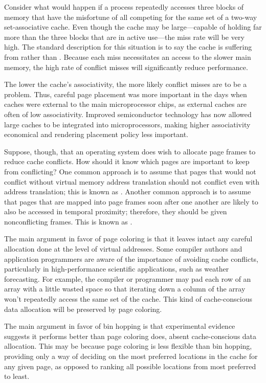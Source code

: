 Consider what would happen if a process repeatedly accesses three
blocks of memory that have the misfortune of all competing for the
same set of a two-way set-associative cache.  Even though the cache may
be large---capable of holding far more than the three blocks that are
in active use---the miss rate will be very high.  The standard description for
this situation is to say the cache is
suffering from  rather than .  Because
each miss necessitates an access to the slower main memory, the high
rate of conflict misses will significantly reduce performance.

The lower the cache's associativity, the more likely conflict misses
are to be a problem.  Thus, careful page placement was more important
in the days when caches were external to the main microprocessor chips,
as external caches are often of low associativity.  Improved
semiconductor technology has now allowed large caches to be integrated
into microprocessors, making higher associativity economical and
rendering placement policy less important.

Suppose, though, that an operating system does wish to allocate page
frames to reduce cache conflicts.  How should it know which
pages are important to keep from conflicting?  One common approach is
to assume that pages that would not conflict without virtual memory
address translation should not conflict even with address translation;
this is known as .  Another common approach
is to assume that pages that are mapped into page frames soon after
one another are likely to also be accessed in temporal proximity;
therefore, they should be given nonconflicting frames.  This is known
as .

The main argument in favor of page coloring is that it leaves intact
any careful allocation done at the level of virtual addresses.  Some
compiler authors and application programmers are aware of the
importance of avoiding cache conflicts, particularly in
high-performance scientific applications, such as weather forecasting.
For example, the compiler or programmer may pad each row of an array
with a little wasted space so that iterating down a column of the
array won't repeatedly access the same set of the cache.  This kind of
cache-conscious data allocation will be preserved by page coloring.

The main argument in favor of bin hopping is that experimental evidence
suggests it performs better
than page coloring does, absent cache-conscious data allocation.  This may be because page coloring is less
flexible than bin hopping, providing only a way of deciding on the
most preferred locations in the cache for any given page, as opposed
to ranking all possible locations from most preferred to least.

